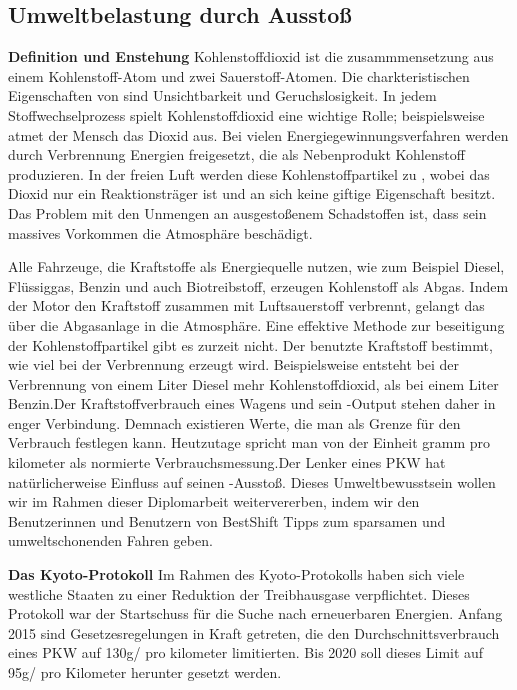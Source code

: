 \subsection{Umweltbelastung durch  Ausstoß}

\textbf{Definition und Enstehung\nextline}
Kohlenstoffdioxid ist die zusammmensetzung aus einem Kohlenstoff-Atom und zwei Sauerstoff-Atomen. Die charkteristischen Eigenschaften von  sind Unsichtbarkeit und Geruchslosigkeit. In jedem Stoffwechselprozess spielt Kohlenstoffdioxid eine wichtige Rolle; beispielsweise atmet der Mensch das Dioxid aus. Bei vielen Energiegewinnungsverfahren werden durch Verbrennung Energien freigesetzt, die als Nebenprodukt Kohlenstoff produzieren. In der freien Luft werden diese Kohlenstoffpartikel zu , wobei das Dioxid nur ein Reaktionsträger ist und an sich keine giftige Eigenschaft besitzt. Das Problem mit den Unmengen an ausgestoßenem Schadstoffen ist, dass sein massives Vorkommen die Atmosphäre beschädigt.

Alle Fahrzeuge, die Kraftstoffe als Energiequelle nutzen, wie zum Beispiel Diesel, Flüssiggas, Benzin und auch Biotreibstoff, erzeugen Kohlenstoff als Abgas. Indem der Motor den Kraftstoff zusammen mit Luftsauerstoff verbrennt, gelangt das  über die Abgasanlage in die Atmosphäre. Eine effektive Methode zur beseitigung der Kohlenstoffpartikel gibt es zurzeit nicht. Der benutzte Kraftstoff bestimmt, wie viel  bei der Verbrennung erzeugt wird. Beispielsweise entsteht bei der Verbrennung von einem Liter Diesel mehr Kohlenstoffdioxid, als bei einem Liter Benzin.Der Kraftstoffverbrauch eines Wagens und sein -Output stehen daher in enger Verbindung. Demnach existieren Werte, die man als Grenze für den Verbrauch festlegen kann. Heutzutage spricht man von der Einheit gramm pro kilometer als normierte Verbrauchsmessung.Der Lenker eines PKW hat natürlicherweise Einfluss auf seinen -Ausstoß. Dieses Umweltbewusstsein wollen wir im Rahmen dieser Diplomarbeit weitervererben, indem wir den Benutzerinnen und Benutzern von BestShift Tipps zum sparsamen und umweltschonenden Fahren geben.

\textbf{Das Kyoto-Protokoll\nextline}
Im Rahmen des Kyoto-Protokolls haben sich viele westliche Staaten zu einer Reduktion der Treibhausgase verpflichtet. 
Dieses Protokoll war der Startschuss für die Suche nach erneuerbaren Energien. 
Anfang 2015 sind Gesetzesregelungen in Kraft getreten, die den Durchschnittsverbrauch eines PKW auf 130g/ pro kilometer limitierten. 
Bis 2020 soll dieses Limit auf 95g/ pro Kilometer herunter gesetzt werden.



\clearpage %